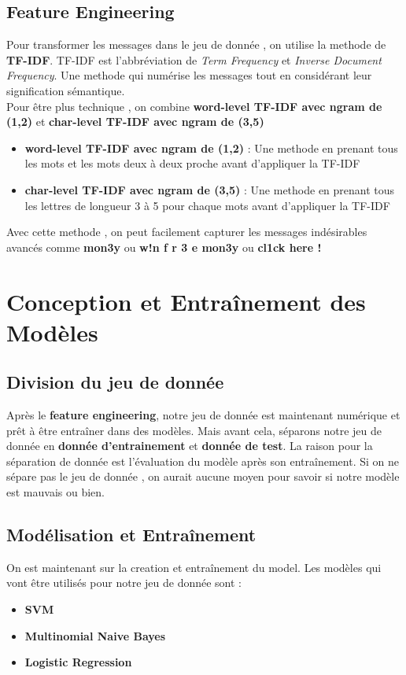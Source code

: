 \documentclass[a4paper,12pt]{article}
\begin{document}
\subsection{Feature Engineering}
Pour transformer les messages dans le jeu de donnée , on utilise la methode de \textbf{TF-IDF}. TF-IDF est l'abbréviation de \textit{Term Frequency} et \textit{Inverse Document Frequency}. Une methode qui numérise les messages tout en considérant leur signification sémantique.\\
Pour être plus technique , on combine \textbf{word-level TF-IDF avec ngram de (1,2)} et \textbf{char-level TF-IDF avec ngram de (3,5)}
\begin{itemize}
	\item{\textbf{word-level TF-IDF avec ngram de (1,2)} : Une methode en prenant tous les mots et les mots deux à deux proche avant d'appliquer la TF-IDF }
	\item{\textbf{char-level TF-IDF avec ngram de (3,5)} : Une methode en prenant tous les lettres de longueur 3 à 5 pour chaque mots avant d'appliquer la TF-IDF }
\end{itemize}
Avec cette methode , on peut facilement capturer les messages indésirables avancés comme \textbf{mon3y} ou \textbf{w!n f r 3 e mon3y} ou \textbf{cl1ck here !}
\vspace*{\fill}
\newpage
\section{Conception et Entraînement des Modèles}
\subsection{Division du jeu de donnée}
Après le \textbf{feature engineering}, notre jeu de donnée est maintenant numérique et prêt à être entraîner dans des modèles. Mais avant cela, séparons notre jeu de donnée en \textbf{donnée d'entrainement} et \textbf{donnée de test}. La raison pour la séparation de donnée est l'évaluation du modèle après son entraînement. Si on ne sépare pas le jeu de donnée , on aurait aucune moyen pour savoir si notre modèle est mauvais ou bien.
\subsection{Modélisation et Entraînement}
On est maintenant sur la creation et entraînement du model. Les modèles qui vont être utilisés pour notre jeu de donnée sont :
\begin{itemize}
	\item{\textbf{SVM}}
	\item{\textbf{Multinomial Naive Bayes}}
	\item{\textbf{Logistic Regression}}
\end{itemize}
\end{document}
